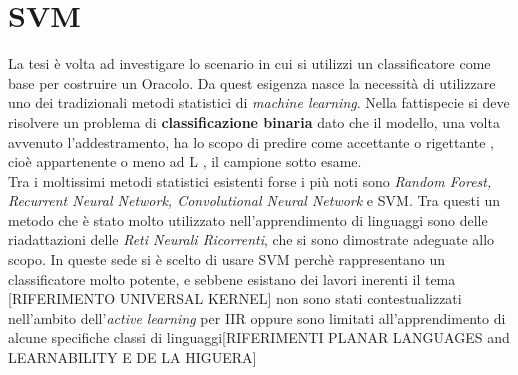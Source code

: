 
\chapter{SVM} %
\label{cap:cinque}
La tesi è volta ad investigare lo scenario in cui si utilizzi un classificatore come base per costruire un Oracolo. Da quest esigenza nasce la necessità di utilizzare uno dei tradizionali metodi statistici di \textit{machine learning}. Nella fattispecie si deve risolvere un problema di \textbf{classificazione binaria} dato che il modello, una volta avvenuto l'addestramento, ha lo scopo di predire come accettante o rigettante , cioè appartenente o meno ad \ac{L} , il campione sotto esame.\\
Tra i moltissimi metodi statistici esistenti forse i più noti sono \textit{Random Forest, Recurrent Neural Network, Convolutional Neural Network} e \ac{SVM}. Tra questi un metodo che è stato molto utilizzato nell'apprendimento di linguaggi sono delle riadattazioni delle \textit{Reti Neurali Ricorrenti}, che si sono dimostrate adeguate allo scopo. In queste sede si è scelto di usare \ac{SVM} perchè rappresentano un classificatore molto potente, e sebbene esistano dei lavori inerenti il tema [RIFERIMENTO UNIVERSAL KERNEL] non sono stati contestualizzati nell'ambito dell'\textit{active learning} per \ac{IIR} oppure sono limitati all'apprendimento di alcune specifiche classi di linguaggi[RIFERIMENTI PLANAR LANGUAGES and LEARNABILITY E DE LA HIGUERA]

